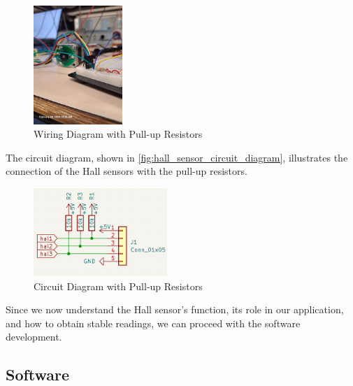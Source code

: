 \begin{figure}[H]
    \centering
    \includegraphics[width=0.3\textwidth]{img/Testing_Hallsensor_8-2-2024/Pictures/pull-up-resistor-breadboard-and-hall-sensor2.jpg}
    \caption{Wiring Diagram with Pull-up Resistors}
    \label{fig:hall_sensor_wiring_diagram}
\end{figure}

The circuit diagram, shown in \autoref{fig:hall_sensor_circuit_diagram}, illustrates the connection of the Hall sensors with the pull-up resistors.

\begin{figure}[H]
    \centering
    \includegraphics[width=0.45\textwidth]{img/Testing_Hallsensor_8-2-2024/Circuit/hall_sensor_circuit.png}
    \caption{Circuit Diagram with Pull-up Resistors}
    \label{fig:hall_sensor_circuit_diagram}
\end{figure}

Since we now understand the Hall sensor's function, its role in our application, and how to obtain stable readings, we can proceed with the software development.



\subsection{Software}





